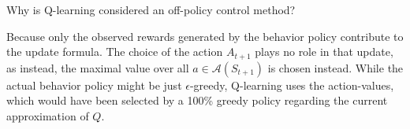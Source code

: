 
\begin{exercise}[Exercise 6.11]

Why is Q-learning considered an off-policy control method?

\end{exercise}


\begin{solution}

Because only the observed rewards generated by the behavior policy
contribute to the update formula. The choice of the action $A_{t+1}$
plays no role in that update, as instead, the maximal value over all $a \in \mathcal{A}(S_{t+1})$
is chosen instead.
While the actual behavior policy might be just $\epsilon$-greedy,
Q-learning uses the action-values, which would have been selected
by a 100\% greedy policy regarding the current approximation of $Q$.

\end{solution}

